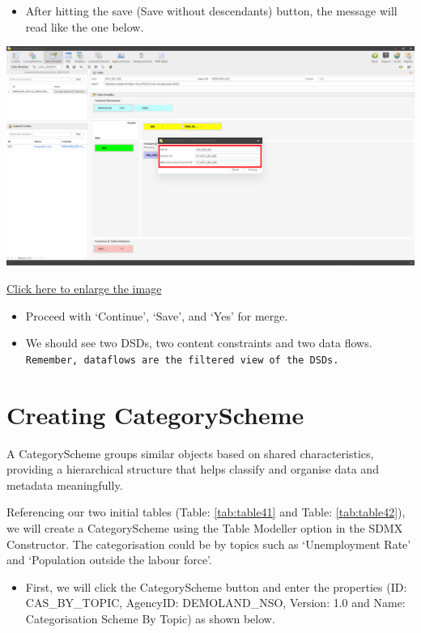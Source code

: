 \documentclass[
]{book}
\providecommand{\tightlist}{%
  \setlength{\itemsep}{0pt}\setlength{\parskip}{0pt}}
\begin{document}
\begin{itemize}
\tightlist
\item
  After hitting the save (Save without descendants) button, the message will read like the one below.
\end{itemize}

\begin{center}\includegraphics[width=1\linewidth]{./images/image158} \end{center}

\href{images/image158.png}{Click here to enlarge the image}

\begin{itemize}
\item
  Proceed with `Continue', `Save', and `Yes' for merge.
\item
  We should see two DSDs, two content constraints and two data flows. \texttt{Remember,\ dataflows\ are\ the\ filtered\ view\ of\ the\ DSDs.}
\end{itemize}

\hypertarget{creating-category}{%
\section{Creating CategoryScheme}\label{creating-category}}

A CategoryScheme groups similar objects based on shared characteristics, providing a hierarchical structure that helps classify and organise data and metadata meaningfully.

Referencing our two initial tables (Table: \ref{tab:table41} and Table: \ref{tab:table42}), we will create a CategoryScheme using the Table Modeller option in the SDMX Constructor. The categorisation could be by topics such as `Unemployment Rate' and `Population outside the labour force'.

\begin{itemize}
\tightlist
\item
  First, we will click the CategoryScheme button and enter the properties (ID: CAS\_BY\_TOPIC, AgencyID: DEMOLAND\_NSO, Version: 1.0 and Name: Categorisation Scheme By Topic) as shown below.
\end{itemize}
\end{document}
